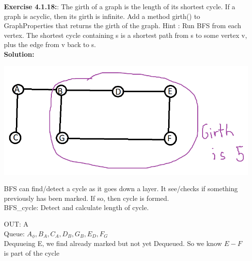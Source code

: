 \documentclass[11pt,fleqn]{article}
\begin{document}
\textbf{Exercise 4.1.18:}: The girth of a graph is the length of its shortest cycle. If a graph is acyclic, then its
girth is infinite. Add a method girth() to GraphProperties that returns the girth of
the graph. Hint : Run BFS from each vertex. The shortest cycle containing s is a shortest
path from s to some vertex v, plus the edge from v back to s.\\

\textbf{Solution:}\\
\begin{center}
	\includegraphics[scale=0.7]{4.1.18.png}
\end{center}
BFS can find/detect a cycle as it goes down a layer. It see/checks if something previously has been marked. If so, then cycle is formed.\\

BFS\_cycle: Detect and calculate length of cycle.

OUT: A\\
Queue: $A_\phi,B_A,C_A,D_B,G_B,E_D,F_G$\\
Dequueing E, we find already marked but not yet Dequeued. So we know $E-F$ is part of the cycle



	
\end{document}
